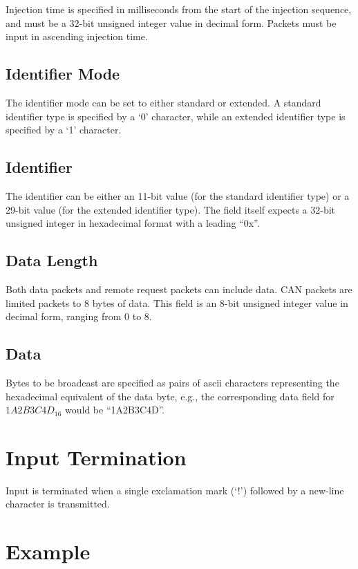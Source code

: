 Injection time is specified in milliseconds from the start of the injection sequence, and must be a 32-bit unsigned integer value in decimal form. Packets must be input in ascending injection time.

\subsection*{Identifier Mode}

The identifier mode can be set to either standard or extended. A standard identifier type is specified by a `0' character, while an extended identifier type is specified by a `1' character.

\subsection*{Identifier}

The identifier can be either an 11-bit value (for the standard identifier type) or a 29-bit value (for the extended identifier type). The field itself expects a 32-bit unsigned integer in hexadecimal format with a leading {}``0x''.

\subsection*{Data Length}

Both data packets and remote request packets can include data. CAN packets are limited packets to 8 bytes of data. This field is an 8-bit unsigned integer value in decimal form, ranging from 0 to 8.

\subsection*{Data}

Bytes to be broadcast are specified as pairs of ascii characters representing the hexadecimal equivalent of the data byte, e.g., the corresponding data field for $1A2B3C4D_{16}$ would be {}``1A2B3C4D''.

\section*{Input Termination}

Input is terminated when a single exclamation mark (`!') followed by a new-line character is transmitted. 

\section*{Example}

